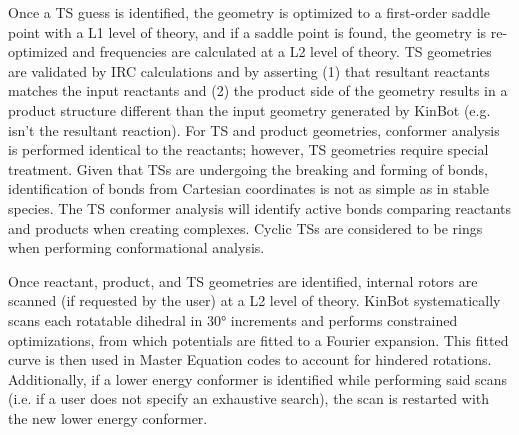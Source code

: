 \documentclass[preprint, 11pt]{elsarticle} %
\begin{document}
Once a TS guess is identified, the geometry is optimized to a first-order saddle point with a L1 level of theory, and if a saddle point is found, the geometry is re-optimized and frequencies are calculated at a L2 level of theory.
TS geometries are validated by IRC calculations and by asserting (1) that resultant reactants matches the input reactants and (2) the product side of the geometry results in a product structure different than the input geometry generated by KinBot (e.g.  isn't the resultant reaction).
For TS and product geometries, conformer analysis is performed identical to the reactants; however, TS geometries require special treatment. 
Given that TSs are undergoing the breaking and forming of bonds, identification of bonds from Cartesian coordinates is not as simple as in stable species.
The TS conformer analysis will identify active bonds comparing reactants and products when creating complexes. 
Cyclic TSs are considered to be rings when performing conformational analysis.

Once reactant, product, and TS geometries are identified, internal rotors are scanned (if requested by the user) at a L2 level of theory.
KinBot systematically scans each rotatable dihedral in \ang{30} increments and performs constrained optimizations, from which potentials are fitted to a Fourier expansion.
This fitted curve is then used in Master Equation codes to account for hindered rotations.
Additionally, if a lower energy conformer is identified while performing said scans (i.e. if a user does not specify an exhaustive search), the scan is restarted with the new lower energy conformer.

\end{document}
